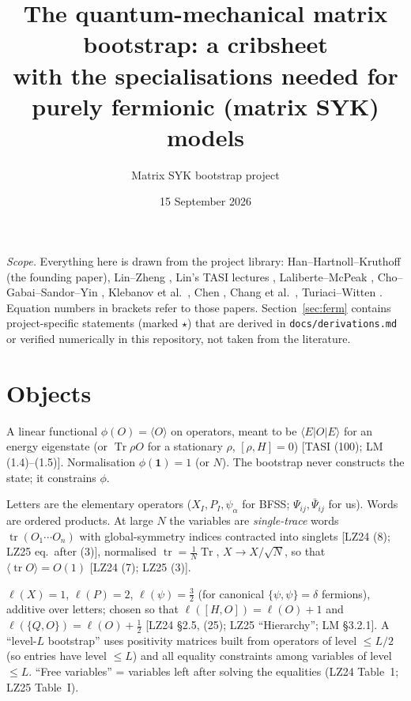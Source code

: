 \documentclass[10pt,a4paper]{article}
\title{\vspace{-1.2cm}The quantum-mechanical matrix bootstrap: a cribsheet\\[2pt]
\large with the specialisations needed for purely fermionic (matrix SYK) models}
\author{Matrix SYK bootstrap project}
\date{15 September 2026}
\newcommand{\tr}{\operatorname{tr}}
\newcommand{\Tr}{\operatorname{Tr}}
\newcommand{\ev}[1]{\langle #1\rangle}
\newcommand{\Psib}{\bar\Psi}
\newcommand{\refnote}[1]{{\small\textcolor{blue!50!black}{[#1]}}}
\begin{document}
\maketitle
\vspace{-0.9cm}
\noindent\textit{Scope.} Everything here is drawn from the project library: Han--Hartnoll--Kruthoff \cite{HHK} (the founding paper), Lin--Zheng \cite{LZ24,LZ25}, Lin's TASI lectures \cite{TASI}, Laliberte--McPeak \cite{LM}, Cho--Gabai--Sandor--Yin \cite{CGSY}, Klebanov et al.\ \cite{KMPT}, Chen \cite{Chen}, Chang et al.\ \cite{CCSY}, Turiaci--Witten \cite{TW}. Equation numbers in brackets refer to those papers. Section~\ref{sec:ferm} contains project-specific statements (marked $\star$) that are derived in \texttt{docs/derivations.md} or verified numerically in this repository, not taken from the literature.

\section{Objects}
\begin{description}[style=nextline,font=\bfseries]
\item[State functional.] A linear functional $\phi(O)=\ev{O}$ on operators, meant to be $\langle E|O|E\rangle$ for an energy eigenstate (or $\Tr\rho O$ for a stationary $\rho$, $[\rho,H]=0$) \refnote{TASI (100); LM (1.4)--(1.5)}. Normalisation $\phi(\mathbf 1)=1$ (or $N$). The bootstrap never constructs the state; it constrains $\phi$.
\item[Letters and words.] Letters are the elementary operators ($X_I,P_I,\psi_\alpha$ for BFSS; $\Psi_{ij},\Psib_{ij}$ for us). Words are ordered products. At large $N$ the variables are \emph{single-trace} words $\tr(O_1\cdots O_n)$ with global-symmetry indices contracted into singlets \refnote{LZ24 (8); LZ25 eq.\ after (3)}, normalised $\tr=\frac1N\Tr$, $X\to X/\sqrt N$, so that $\ev{\tr O}=O(1)$ \refnote{LZ24 (7); LZ25 (3)}.
\item[Level (hierarchy).] $\ell(X)=1$, $\ell(P)=2$, $\ell(\psi)=\tfrac32$ (for canonical $\{\psi,\psi\}=\delta$ fermions), additive over letters; chosen so that $\ell([H,O])=\ell(O)+1$ and $\ell(\{Q,O\})=\ell(O)+\tfrac12$ \refnote{LZ24 \S2.5, (25); LZ25 ``Hierarchy''; LM \S3.2.1}. A ``level-$L$ bootstrap'' uses positivity matrices built from operators of level $\le L/2$ (so entries have level $\le L$) and all equality constraints among variables of level $\le L$. ``Free variables'' = variables left after solving the equalities (LZ24 Table~1; LZ25 Table~I).
\end{description}
\end{document}
